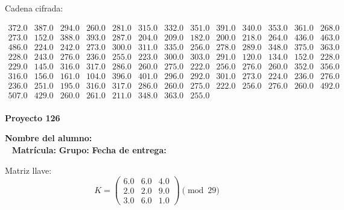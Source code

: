 \documentclass[12pt]{article}
\begin{document}
Cadena cifrada:
\begin{center}
$\begin{array}{lllllllllllll}
372.0 & 387.0 & 294.0 & 260.0 & 281.0 & 315.0 & 332.0 & 351.0 & 391.0 & 340.0 & 353.0 & 361.0 & 268.0\\
273.0 & 152.0 & 388.0 & 393.0 & 287.0 & 204.0 & 209.0 & 182.0 & 200.0 & 218.0 & 264.0 & 436.0 & 463.0\\
486.0 & 224.0 & 242.0 & 273.0 & 300.0 & 311.0 & 335.0 & 256.0 & 278.0 & 289.0 & 348.0 & 375.0 & 363.0\\
228.0 & 243.0 & 276.0 & 236.0 & 255.0 & 223.0 & 300.0 & 303.0 & 291.0 & 120.0 & 134.0 & 152.0 & 228.0\\
229.0 & 145.0 & 316.0 & 317.0 & 286.0 & 260.0 & 275.0 & 222.0 & 256.0 & 276.0 & 260.0 & 352.0 & 356.0\\
316.0 & 156.0 & 161.0 & 104.0 & 396.0 & 401.0 & 296.0 & 292.0 & 301.0 & 273.0 & 224.0 & 236.0 & 276.0\\
236.0 & 251.0 & 195.0 & 316.0 & 317.0 & 286.0 & 260.0 & 275.0 & 222.0 & 256.0 & 276.0 & 260.0 & 492.0\\
507.0 & 429.0 & 260.0 & 261.0 & 211.0 & 348.0 & 363.0 & 255.0\\
\end{array}$
\end{center}

\newpage


\textbf{Proyecto 126}

\textbf{Nombre del alumno:} \underline{\hspace{13cm}}\\\
\vspace{1cm}
\textbf{Matrícula:} \underline{\hspace{4cm}} \hspace{1cm}
\textbf{Grupo:} \underline{\hspace{2cm}}
\textbf{Fecha de entrega:} \underline{\hspace{2cm}}

\medskip

Matriz llave:
\[
K = \begin{pmatrix}
6.0 & 6.0 & 4.0\\
2.0 & 2.0 & 9.0\\
3.0 & 6.0 & 1.0
\end{pmatrix} \pmod{29}
\]
\end{document}
